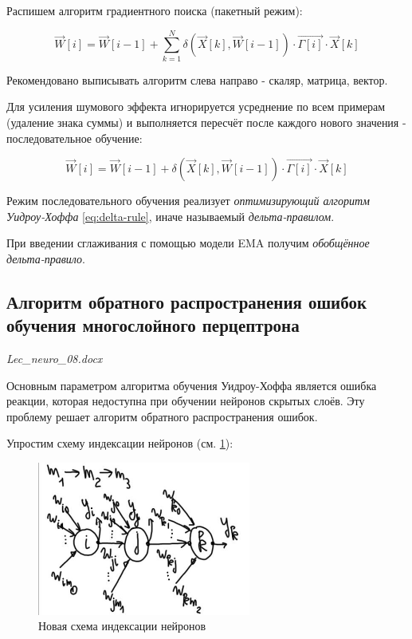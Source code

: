 \documentclass{article}
\numberwithin{equation}{subsection}
\begin{document}
Распишем алгоритм градиентного поиска (пакетный режим):

\begin{equation}
    \vec{W}[i] = \vec{W}[i-1] + \sum_{k=1}^{N} \delta(\vec{X}[k], \vec{W}[i-1])\cdot \vec{\Gamma[i]} \cdot \vec{X}[k]
\end{equation}

\begin{myquote}
    Рекомендовано выписывать алгоритм слева направо - скаляр, матрица, вектор.
\end{myquote}

Для усиления шумового эффекта игнорируется усреднение по всем примерам (удаление знака суммы) и выполняется 
пересчёт после каждого нового значения - последовательное обучение:

\begin{equation}
    \vec{W}[i] = \vec{W}[i-1] + \delta(\vec{X}[k], \vec{W}[i-1])\cdot \vec{\Gamma[i]} \cdot \vec{X}[k]
    \label{eq:delta-rule}
\end{equation}

Режим последовательного обучения реализует \textit{оптимизирующий алгоритм Уидроу-Хоффа} \ref{eq:delta-rule}, 
иначе называемый \textit{дельта-правилом}.

При введении сглаживания с помощью модели EMA получим \textit{обобщённое дельта-правило}.




\subsection{Алгоритм обратного распространения ошибок обучения многослойного перцептрона}

\begin{myquote}
    \textit{Lec\_neuro\_08.docx}
\end{myquote}

Основным параметром алгоритма обучения Уидроу-Хоффа является ошибка реакции, которая 
недоступна при обучении нейронов скрытых слоёв.
Эту проблему решает алгоритм обратного распространения ошибок.

Упростим схему индексации нейронов (см. \ref{hyperflat_10_1}):

\begin{figure}[htbp]
    \centering
    \includegraphics[width=7cm]{hyperflat_10_1.jpeg}
    \caption{Новая схема индексации нейронов}
    \label{hyperflat_10_1}
\end{figure}
\end{document}
